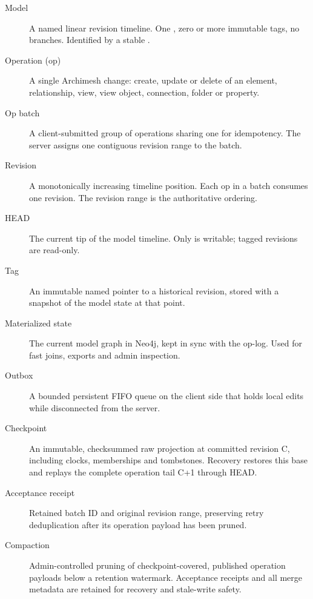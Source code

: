 \begin{description}
\item[Model] A named linear revision timeline. One , zero or more
  immutable tags, no branches. Identified by a stable .
\item[Operation (op)] A single Archimesh change: create, update or delete of an
  element, relationship, view, view object, connection, folder or property.
\item[Op batch] A client-submitted group of operations sharing one
   for idempotency. The server assigns one contiguous
  revision range to the batch.
\item[Revision] A monotonically increasing timeline position. Each op in a
  batch consumes one revision. The revision range is the authoritative ordering.
\item[HEAD] The current tip of the model timeline. Only  is
  writable; tagged revisions are read-only.
\item[Tag] An immutable named pointer to a historical revision, stored with a
  snapshot of the model state at that point.
\item[Materialized state] The current model graph in Neo4j, kept in sync with
  the op-log. Used for fast joins, exports and admin inspection.
\item[Outbox] A bounded persistent FIFO queue on the client side that holds
  local edits while disconnected from the server.
\item[Checkpoint] An immutable, checksummed raw projection at committed
  revision C, including clocks, memberships and tombstones. Recovery restores
  this base and replays the complete operation tail C+1 through HEAD.
\item[Acceptance receipt] Retained batch ID and original revision range,
  preserving retry deduplication after its operation payload has been pruned.
\item[Compaction] Admin-controlled pruning of checkpoint-covered, published
  operation payloads below a retention watermark. Acceptance receipts and all
  merge metadata are retained for recovery and stale-write safety.
\end{description}
